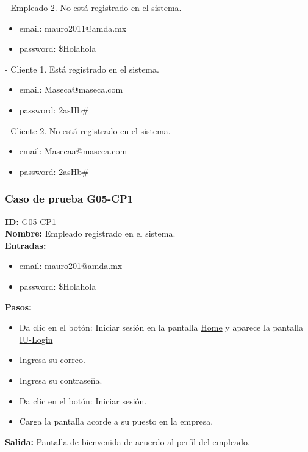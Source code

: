- Empleado 2. No está registrado en el sistema. 
\begin{itemize}
    \item email: mauro2011@amda.mx
    \item password: \$Holahola
\end{itemize}

- Cliente 1. Está registrado en el sistema.
\begin{itemize}
    \item email: Maseca@maseca.com
    \item password: 2asHb\#
\end{itemize}

- Cliente 2. No está registrado en el sistema.
\begin{itemize}
    \item email: Masecaa@maseca.com
    \item password: 2asHb\#
\end{itemize}

\subsubsection{Caso de prueba G05-CP1}
\textbf{ID:} G05-CP1\\
\textbf{Nombre:} Empleado registrado en el sistema.\\
\textbf{Entradas:} 
\begin{itemize}
    \item email: mauro201@amda.mx
    \item password: \$Holahola\\
\end{itemize}
\textbf{Pasos:}
\begin{itemize}
    \item Da clic en el botón: Iniciar sesión en la pantalla \hyperlink{IU:IU-HOME}{Home} y aparece la pantalla \hyperlink{IU:IU-Login}{IU-Login}
    \item Ingresa su correo.
    \item Ingresa su contraseña.
    \item Da clic en el botón: Iniciar sesión.
    \item Carga la pantalla acorde a su puesto en la empresa.
\end{itemize}
\textbf{Salida:}
Pantalla de bienvenida de acuerdo al perfil del empleado.

